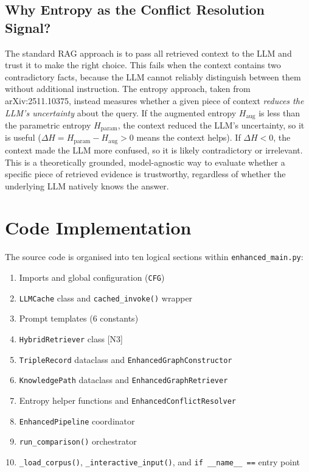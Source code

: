 \subsection{Why Entropy as the Conflict Resolution Signal?}

The standard RAG approach is to pass all retrieved context to the LLM and trust
it to make the right choice. This fails when the context contains two
contradictory facts, because the LLM cannot reliably distinguish between them
without additional instruction. The entropy approach, taken from arXiv:2511.10375,
instead measures whether a given piece of context \emph{reduces the LLM's
uncertainty} about the query. If the augmented entropy $H_{\text{aug}}$ is less
than the parametric entropy $H_{\text{param}}$, the context reduced the LLM's
uncertainty, so it is useful ($\Delta H = H_{\text{param}} - H_{\text{aug}} > 0$
means the context helps). If $\Delta H < 0$, the context made the LLM more
confused, so it is likely contradictory or irrelevant. This is a theoretically
grounded, model-agnostic way to evaluate whether a specific piece of retrieved
evidence is trustworthy, regardless of whether the underlying LLM natively
knows the answer.

\section{Code Implementation}

The source code is organised into ten logical sections within
\texttt{enhanced\_main.py}:

\begin{enumerate}
    \item Imports and global configuration (\texttt{CFG})
    \item \texttt{LLMCache} class and \texttt{cached\_invoke()} wrapper
    \item Prompt templates (6 constants)
    \item \texttt{HybridRetriever} class [N3]
    \item \texttt{TripleRecord} dataclass and \texttt{EnhancedGraphConstructor}
    \item \texttt{KnowledgePath} dataclass and \texttt{EnhancedGraphRetriever}
    \item Entropy helper functions and \texttt{EnhancedConflictResolver}
    \item \texttt{EnhancedPipeline} coordinator
    \item \texttt{run\_comparison()} orchestrator
    \item \texttt{\_load\_corpus()}, \texttt{\_interactive\_input()}, and
    \texttt{if \_\_name\_\_ ==} entry point
\end{enumerate}

